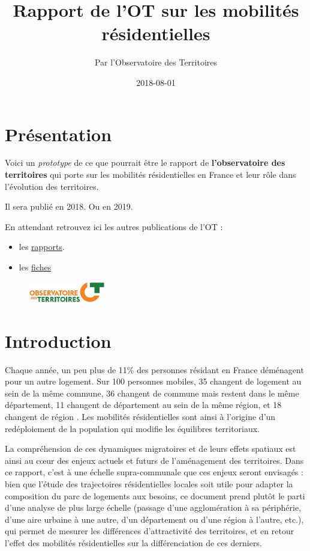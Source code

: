 \documentclass[]{book}
\title{Rapport de l'OT sur les mobilités résidentielles}
\author{Par l'Observatoire des Territoires}
\date{2018-08-01}
\begin{document}
\maketitle

{
\setcounter{tocdepth}{1}
\tableofcontents
}
\chapter{Présentation}\label{presentation}

Voici un \emph{prototype} de ce que pourrait être le rapport de
\textbf{l'observatoire des territoires} qui porte sur les mobilités
résidentielles en France et leur rôle dans l'évolution des territoires.

Il sera publié en 2018. Ou en 2019.

En attendant retrouvez ici les autres publications de l'OT :

\begin{itemize}
\item
  les
  \href{http://www.observatoire-des-territoires.gouv.fr/observatoire-des-territoires/fr/rapports/}{rapports}.
\item
  les
  \href{http://www.observatoire-des-territoires.gouv.fr/observatoire-des-territoires/fr/fiches-danalyse/}{fiches}
\end{itemize}

\begin{figure}
\centering
\includegraphics[width=0.30000\textwidth]{./img/logo_OT.png}
\caption{}
\end{figure}

\chapter{Introduction}\label{intro}

Chaque année, un peu plus de 11\% des personnes résidant en France
déménagent pour un autre logement. Sur 100 personnes mobiles, 35
changent de logement au sein de la même commune, 36 changent de commune
mais restent dans le même département, 11 changent de département au
sein de la même région, et 18 changent de région . Les mobilités
résidentielles sont ainsi à l'origine d'un redéploiement de la
population qui modifie les équilibres territoriaux.

La compréhension de ces dynamiques migratoires et de leurs effets
spatiaux est ainsi au cœur des enjeux actuels et futurs de l'aménagement
des territoires. Dans ce rapport, c'est à une échelle supra-communale
que ces enjeux seront envisagés : bien que l'étude des trajectoires
résidentielles locales soit utile pour adapter la composition du parc de
logements aux besoins, ce document prend plutôt le parti d'une analyse
de plus large échelle (passage d'une agglomération à sa périphérie,
d'une aire urbaine à une autre, d'un département ou d'une région à
l'autre, etc.), qui permet de mesurer les différences d'attractivité des
territoires, et en retour l'effet des mobilités résidentielles sur la
différenciation de ces derniers.
\end{document}
